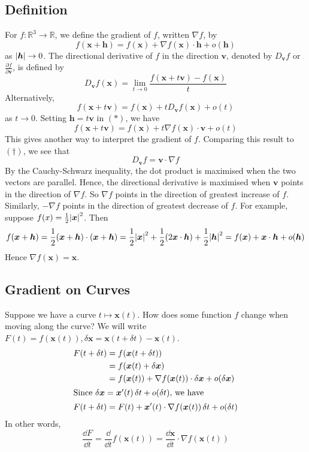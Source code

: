 \documentclass{article}
\begin{document}
\subsection{Definition}
For $f \colon \mathbb R^3 \to \mathbb R$, we define the gradient of $f$, written $\nabla f$, by
\begin{equation}
    f(\bm x + \bm h) = f(\bm x) + \nabla f(\bm x) \cdot \bm h + o(\bm h)
    \tag{$\ast$}
\end{equation}
as $\abs{\bm h} \to 0$. The directional derivative of $f$ in the direction $\bm v$, denoted by $D_{\bm v} f$ or $\frac{\partial f}{\partial \bm v}$, is defined by
\[ D_{\bm v} f(\bm x) = \lim_{t \to 0} \frac{f(\bm x + t\bm v) - f(\bm x)}{t} \]
Alternatively,
\begin{equation}
    f(\bm x + t\bm v) = f(\bm x) + t D_{\bm v}f(\bm x) + o(t)
    \tag{$\dagger$}
\end{equation}
as $t \to 0$. Setting $\bm h = t\bm v$ in $(\ast)$, we have
\[ f(\bm x + t\bm v) = f(\bm x) + t \nabla f(\bm x) \cdot \bm v + o(t) \]
This gives another way to interpret the gradient of $f$. Comparing this result to $(\dagger)$, we see that
\[ D_{\bm v} f = \bm v \cdot \nabla f \]
By the Cauchy-Schwarz inequality, the dot product is maximised when the two vectors are parallel. Hence, the directional derivative is maximised when $\bm v$ points in the direction of $\nabla f$. So $\nabla f$ points in the direction of greatest increase of $f$. Similarly, $-\nabla f$ points in the direction of greatest decrease of $f$. For example, suppose $f(x) = \frac{1}{2}\abs{\bm x}^2$. Then
\[ f(\bm x + \bm h) = \frac{1}{2}(\bm x + \bm h)\cdot (\bm x + \bm h) = \frac{1}{2}\abs{\bm x}^2 + \frac{1}{2}(2\bm x \cdot \bm h) + \frac{1}{2}\abs{\bm h}^2 = f(\bm x) + \bm x \cdot \bm h + o(\bm h) \]
Hence $\nabla f(\bm x) = \bm x$.

\subsection{Gradient on Curves}
Suppose we have a curve $t \mapsto \bm x(t)$. How does some function $f$ change when moving along the curve? We will write $F(t) = f(\bm x(t)), \delta \bm x = \bm x(t + \delta t) - \bm x(t)$.
\begin{align*}
    F(t + \delta t) & = f(\bm x(t + \delta t))                                                \\
                    & = f(\bm x(t) + \delta \bm x)                                            \\
                    & = f(\bm x(t)) + \nabla f(\bm x(t)) \cdot \delta \bm x + o(\delta \bm x) \\
    \intertext{Since $\delta \bm x = \bm x'(t) \,\delta t + o(\delta t)$, we have}
    F(t + \delta t) & = F(t) + \bm x'(t) \cdot \nabla f(\bm x(t)) \,\delta t + o(\delta t)
\end{align*}
In other words,
\[ \frac{\dd F}{\dd t} = \frac{\dd}{\dd t}f(\bm x(t)) = \frac{\dd \bm x}{\dd t} \cdot \nabla f(\bm x(t)) \]
\end{document}
